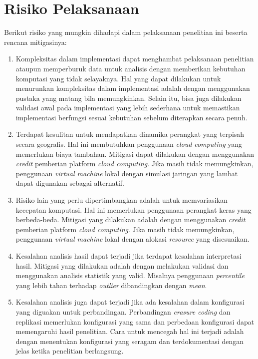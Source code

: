 \section{Risiko Pelaksanaan}
\label{sec:risiko-pelaksanaan}
Berikut risiko yang mungkin dihadapi dalam pelaksanaan penelitian ini beserta rencana mitigasinya:

\begin{enumerate}
    \item Kompleksitas dalam implementasi dapat menghambat pelaksanaan penelitian ataupun memperburuk data untuk analisis dengan memberikan kebutuhan komputasi yang tidak selayaknya. Hal yang dapat dilakukan untuk menurunkan kompleksitas dalam implementasi adalah dengan menggunakan pustaka yang matang bila memungkinkan. Selain itu, bisa juga dilakukan validasi awal pada implementasi yang lebih sederhana untuk memastikan implementasi berfungsi sesuai kebutuhan sebelum diterapkan secara penuh.
    \item Terdapat kesulitan untuk mendapatkan dinamika perangkat yang terpisah secara geografis. Hal ini membutuhkan penggunaan \textit{cloud computing} yang memerlukan biaya tambahan. Mitigasi dapat dilakukan dengan menggunakan \textit{credit} pemberian platform \textit{cloud computing}. Jika masih tidak memungkinkan, penggunaan \textit{virtual machine} lokal dengan simulasi jaringan yang lambat dapat digunakan sebagai alternatif.
    \item Risiko lain yang perlu dipertimbangkan adalah untuk memvariasikan kecepatan komputasi. Hal ini memerlukan penggunaan perangkat keras yang berbeda-beda. Mitigasi yang dilakukan adalah dengan menggunakan \textit{credit} pemberian platform \textit{cloud computing}. Jika masih tidak memungkinkan, penggunaan \textit{virtual machine} lokal dengan alokasi \textit{resource} yang disesuaikan.
    \item Kesalahan analisis hasil dapat terjadi jika terdapat kesalahan interpretasi hasil. Mitigasi yang dilakukan adalah dengan melakukan validasi dan menggunakan analisis statistik yang valid. Misalnya penggunaan \textit{percentile} yang lebih tahan terhadap \textit{outlier} dibandingkan dengan \textit{mean}.
    \item Kesalahan analisis juga dapat terjadi jika ada kesalahan dalam konfigurasi yang diguakan untuk perbandingan. Perbandingan \textit{erasure coding} dan replikasi memerlukan konfigurasi yang sama dan perbedaan konfigurasi dapat memengaruhi hasil penelitian. Cara untuk mencegah hal ini terjadi adalah dengan menentukan konfigurasi yang seragam dan terdokumentasi dengan jelas ketika penelitian berlangsung.
\end{enumerate}